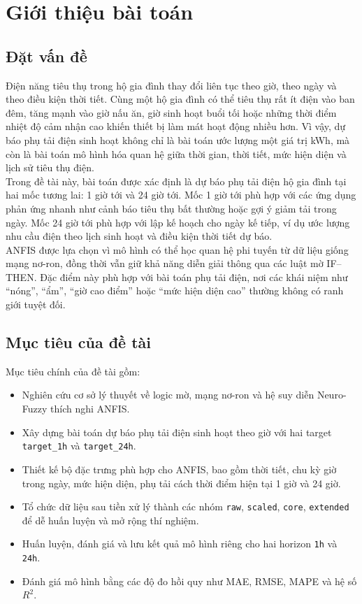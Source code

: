 \chapter{Giới thiệu bài toán}

\section{Đặt vấn đề}

Điện năng tiêu thụ trong hộ gia đình thay đổi liên tục theo giờ, theo ngày và theo điều kiện thời tiết. Cùng một hộ gia đình có thể tiêu thụ rất ít điện vào ban đêm, tăng mạnh vào giờ nấu ăn, giờ sinh hoạt buổi tối hoặc những thời điểm nhiệt độ cảm nhận cao khiến thiết bị làm mát hoạt động nhiều hơn. Vì vậy, dự báo phụ tải điện sinh hoạt không chỉ là bài toán ước lượng một giá trị kWh, mà còn là bài toán mô hình hóa quan hệ giữa thời gian, thời tiết, mức hiện diện và lịch sử tiêu thụ điện.
\\
Trong đề tài này, bài toán được xác định là dự báo phụ tải điện hộ gia đình tại hai mốc tương lai: 1 giờ tới và 24 giờ tới. Mốc 1 giờ tới phù hợp với các ứng dụng phản ứng nhanh như cảnh báo tiêu thụ bất thường hoặc gợi ý giảm tải trong ngày. Mốc 24 giờ tới phù hợp với lập kế hoạch cho ngày kế tiếp, ví dụ ước lượng nhu cầu điện theo lịch sinh hoạt và điều kiện thời tiết dự báo.
\\
ANFIS được lựa chọn vì mô hình có thể học quan hệ phi tuyến từ dữ liệu giống mạng nơ-ron, đồng thời vẫn giữ khả năng diễn giải thông qua các luật mờ IF--THEN. Đặc điểm này phù hợp với bài toán phụ tải điện, nơi các khái niệm như ``nóng'', ``ẩm'', ``giờ cao điểm'' hoặc ``mức hiện diện cao'' thường không có ranh giới tuyệt đối.

\section{Mục tiêu của đề tài}

Mục tiêu chính của đề tài gồm:

\begin{itemize}[leftmargin=1.2cm]
  \item Nghiên cứu cơ sở lý thuyết về logic mờ, mạng nơ-ron và hệ suy diễn Neuro-Fuzzy thích nghi ANFIS.
  \item Xây dựng bài toán dự báo phụ tải điện sinh hoạt theo giờ với hai target \texttt{target\_1h} và \texttt{target\_24h}.
  \item Thiết kế bộ đặc trưng phù hợp cho ANFIS, bao gồm thời tiết, chu kỳ giờ trong ngày, mức hiện diện, phụ tải cách thời điểm hiện tại 1 giờ và 24 giờ.
  \item Tổ chức dữ liệu sau tiền xử lý thành các nhóm \texttt{raw}, \texttt{scaled}, \texttt{core}, \texttt{extended} để dễ huấn luyện và mở rộng thí nghiệm.
  \item Huấn luyện, đánh giá và lưu kết quả mô hình riêng cho hai horizon \texttt{1h} và \texttt{24h}.
  \item Đánh giá mô hình bằng các độ đo hồi quy như MAE, RMSE, MAPE và hệ số $R^2$.
\end{itemize}

